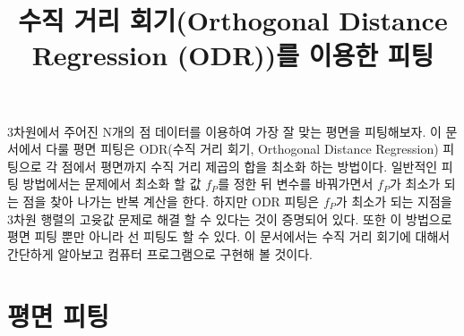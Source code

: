 \documentclass[a4paper,14pt]{oblivoir}
\begin{document}
\title{수직 거리 회기(Orthogonal Distance Regression (ODR))를 이용한 피팅}
\maketitle

3차원에서 주어진 N개의 점 데이터를 이용하여 가장 잘 맞는 평면을 피팅해보자.
이 문서에서 다룰 평면 피팅은 ODR(수직 거리 회기, Orthogonal Distance Regression) 피팅으로
각 점에서 평면까지 수직 거리 제곱의 합을 최소화 하는 방법이다.
일반적인 피팅 방법에서는 문제에서 최소화 할 값 $f_P$를 정한 뒤 변수를 바꿔가면서
$f_P$가 최소가 되는 점을 찾아 나가는 반복 계산을 한다.
하지만 ODR 피팅은 $f_P$가 최소가 되는 지점을 3차원 행렬의 고윳값 문제로 해결 할 수 있다는 것이 증명되어 있다.
또한 이 방법으로 평면 피팅 뿐만 아니라 선 피팅도 할 수 있다.
이 문서에서는 수직 거리 회기에 대해서 간단하게 알아보고 컴퓨터 프로그램으로 구현해 볼 것이다.

\chapter{평면 피팅}\label{chapter_fitplane}
\end{document}
